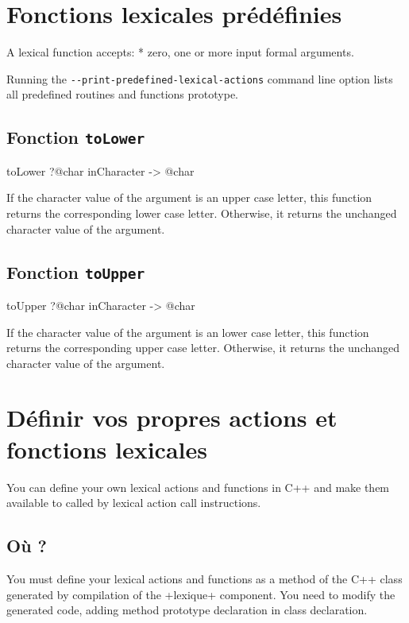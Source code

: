 \section{Fonctions lexicales prédéfinies}


A lexical function accepts:
  * zero, one or more input formal arguments.

Running the \texttt{-{}-print-predefined-lexical-actions} command line option lists all predefined routines and functions prototype.

\subsection{Fonction \texttt{toLower}}

\begin{galgas4}
toLower ?@char inCharacter -> @char
\end{galgas4}

If the character value of the argument is an upper case letter, this function returns the corresponding lower case letter. Otherwise, it returns the unchanged character value of the argument.

\subsection{Fonction \texttt{toUpper}}

\begin{galgas4}
toUpper ?@char inCharacter -> @char
\end{galgas4}


If the character value of the argument is an lower case letter, this function returns the corresponding upper case letter. Otherwise, it returns the unchanged character value of the argument.



\section{Définir vos propres actions et fonctions lexicales}

You can define your own lexical actions and functions in C++ and make them available to called by lexical action call instructions.

\subsection{Où ?}

You must define your lexical actions and functions as a method of the C++ class generated by compilation of the \ggsq+lexique+ component. You need to modify the generated code, adding method prototype declaration in class declaration.

